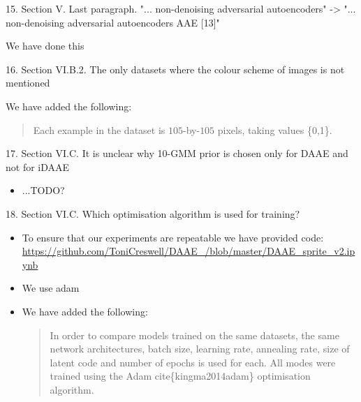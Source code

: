 \documentclass{article}
\begin{document}
{\color{blue}
15. Section V. Last paragraph. "... non-denoising adversarial autoencoders" -> "... non-denoising adversarial autoencoders AAE [13]"} \newline

We have done this

{\color{blue}
16. Section VI.B.2. The only datasets where the colour scheme of images is not mentioned} \newline

We have added the following: 
\begin{quote}
     Each example in the dataset is $105$-by-$105$ pixels, taking values \{0,1\}. 
\end{quote}

{\color{blue}
17. Section VI.C. It is unclear why 10-GMM prior is chosen only for DAAE and not for iDAAE} \newline

\begin{itemize}
    \item ...TODO? 
\end{itemize}

{\color{blue}
18. Section VI.C. Which optimisation algorithm is used for training?}
\begin{itemize}
    \item To ensure that our experiments are repeatable we have provided code: \url{https://github.com/ToniCreswell/DAAE_/blob/master/DAAE_sprite_v2.ipynb}
    \item We use adam
    \item We have added the following:
    \begin{quote}
        In order to compare models trained on the same datasets, the same network architectures, batch size, learning rate, annealing rate, size of latent code and number of epochs is used for each. All modes were trained using the Adam cite\{kingma2014adam\} optimisation algorithm.
    \end{quote}
\end{itemize}
\end{document}
